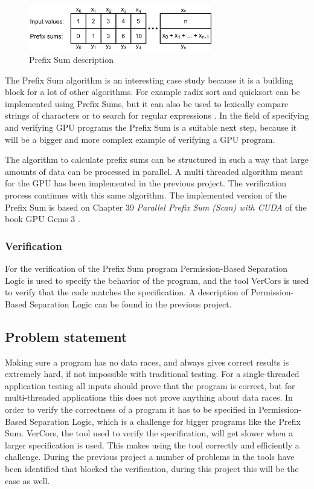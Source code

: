 \documentclass[a4paper]{article}
\begin{document}
\begin{figure}[htb!]
	\centering
	\includegraphics[width=80mm]{../images/prefix-sum-v1.png}
	\caption{Prefix Sum description}
	\label{prefixsumexample}
\end{figure}

The Prefix Sum algorithm is an interesting case study because it is a building block for a lot of other algorithms. For example radix sort and quicksort can be implemented using Prefix Sums, but it can also be used to lexically compare strings of characters or to search for regular expressions \cite{Blelloch:PrefixSumApplications}. In the field of specifying and verifying GPU programs the Prefix Sum is a suitable next step, because it will be a bigger and more complex example of verifying a GPU program.

The algorithm to calculate prefix sums can be structured in such a way that large amounts of data can be processed in parallel. A multi threaded algorithm meant for the GPU has been implemented in the previous project. The verification process continues with this same algorithm. The implemented version of the Prefix Sum is based on Chapter 39 \emph{Parallel Prefix Sum (Scan) with CUDA} of the book GPU Gems 3 \cite{Nguyen:GPUGems3}.

\subsubsection{Verification}
For the verification of the Prefix Sum program Permission-Based Separation Logic is used to specify the behavior of the program, and the tool VerCors is used to verify that the code matches the specification. A description of Permission-Based Separation Logic can be found in the previous project\cite{bachelorThesis}. 

\subsection{Problem statement}
Making sure a program has no data races, and always gives correct results is extremely hard, if not impossible with traditional testing. For a single-threaded application testing all inputs should prove that the program is correct, but for multi-threaded applications this does not prove anything about data races. In order to verify the correctness of a program it has to be specified in Permission-Based Separation Logic, which is a challenge for bigger programs like the Prefix Sum. VerCors, the tool used to verify the specification, will get slower when a larger specification is used. This makes using the tool correctly and efficiently a challenge. During the previous project a number of problems in the tools have been identified that blocked the verification, during this project this will be the case as well.
\end{document}
